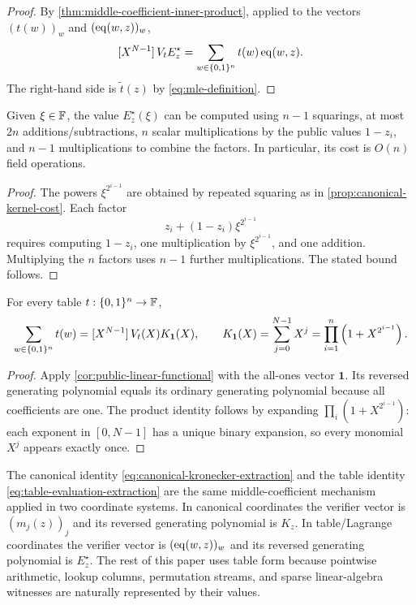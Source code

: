 \begin{proof}
By \cref{thm:middle-coefficient-inner-product}, applied to the vectors $(t(w))_w$ and $(\operatorname{eq}(w,z))_w$,
\[
  [X^{N-1}]\,V_tE_z^{\star}
  =\sum_{w\in\{0,1\}^n}t(w)\operatorname{eq}(w,z).
\]
The right-hand side is $\widetilde t(z)$ by \eqref{eq:mle-definition}.
\end{proof}

\begin{proposition}
\label{prop:table-kernel-cost}
Given $\xi\in\mathbb{F}$, the value $E_z^{\star}(\xi)$ can be computed using $n-1$ squarings, at most $2n$ additions/subtractions, $n$ scalar multiplications by the public values $1-z_i$, and $n-1$ multiplications to combine the factors.  In particular, its cost is $O(n)$ field operations.
\end{proposition}

\begin{proof}
The powers $\xi^{2^{i-1}}$ are obtained by repeated squaring as in \cref{prop:canonical-kernel-cost}.  Each factor
\[
  z_i+(1-z_i)\xi^{2^{i-1}}
\]
requires computing $1-z_i$, one multiplication by $\xi^{2^{i-1}}$, and one addition.  Multiplying the $n$ factors uses $n-1$ further multiplications.  The stated bound follows.
\end{proof}

\begin{corollary}
\label{cor:hypercube-sum-extraction}
For every table $t:\{0,1\}^n\to\mathbb{F}$,
\begin{equation}
  \sum_{w\in\{0,1\}^n}t(w)
  =[X^{N-1}]\,V_t(X)K_{\mathbf 1}(X),
  \qquad
  K_{\mathbf 1}(X)=\sum_{j=0}^{N-1}X^j
  =\prod_{i=1}^{n}\left(1+X^{2^{i-1}}\right).
  \label{eq:hypercube-sum-extraction}
\end{equation}
\end{corollary}

\begin{proof}
Apply \cref{cor:public-linear-functional} with the all-ones vector $\mathbf1$.  Its reversed generating polynomial equals its ordinary generating polynomial because all coefficients are one.  The product identity follows by expanding $\prod_i(1+X^{2^{i-1}})$: each exponent in $[0,N-1]$ has a unique binary expansion, so every monomial $X^j$ appears exactly once.
\end{proof}

\begin{remark}
\label{rem:two-evaluation-viewpoints}
The canonical identity \eqref{eq:canonical-kronecker-extraction} and the table identity \eqref{eq:table-evaluation-extraction} are the same middle-coefficient mechanism applied in two coordinate systems.  In canonical coordinates the verifier vector is $(m_j(z))_j$ and its reversed generating polynomial is $K_z$.  In table/Lagrange coordinates the verifier vector is $(\operatorname{eq}(w,z))_w$ and its reversed generating polynomial is $E_z^{\star}$.  The rest of this paper uses table form because pointwise arithmetic, lookup columns, permutation streams, and sparse linear-algebra witnesses are naturally represented by their values.
\end{remark}

